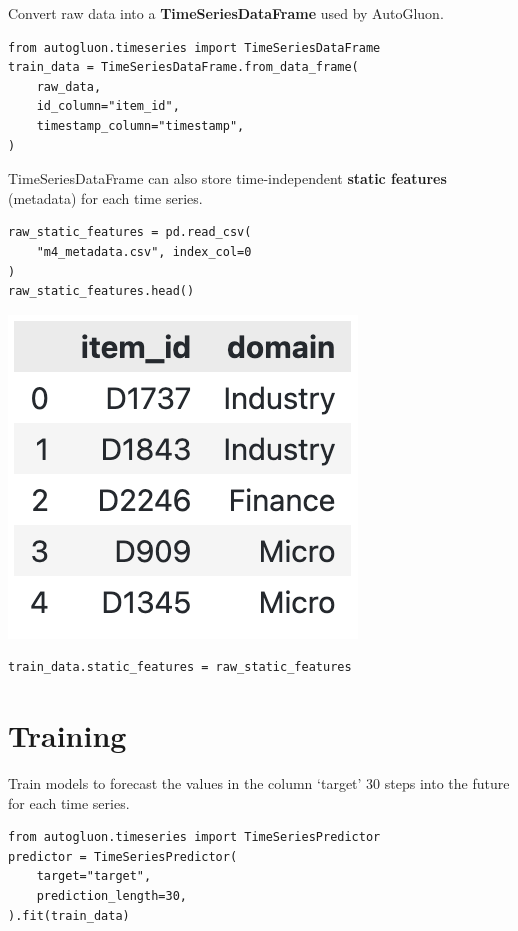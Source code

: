 \medskip

Convert raw data into a \textbf{TimeSeriesDataFrame} used by AutoGluon.

\begin{verbatim}
from autogluon.timeseries import TimeSeriesDataFrame
train_data = TimeSeriesDataFrame.from_data_frame(
    raw_data,
    id_column="item_id",
    timestamp_column="timestamp",
)
\end{verbatim}

TimeSeriesDataFrame can also store time-independent \textbf{static features} (metadata) for each time series.

\begin{verbatim}
raw_static_features = pd.read_csv(
    "m4_metadata.csv", index_col=0
)
raw_static_features.head()
\end{verbatim}

\begin{center}
\includegraphics[width=0.22\linewidth]{timeseries/images/static_features.png}
\end{center}


\begin{verbatim}
train_data.static_features = raw_static_features
\end{verbatim}

\vfill\null
\columnbreak

\section*{Training}

Train models to forecast the values in the column ‘target’ 30 steps into the future for each time series.

\begin{verbatim}
from autogluon.timeseries import TimeSeriesPredictor
predictor = TimeSeriesPredictor(
    target="target",
    prediction_length=30,
).fit(train_data)
\end{verbatim}

